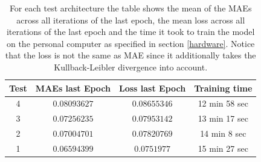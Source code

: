 \begin{center}
    \begin{table}[H]
        \centering
        \begin{tabular}{ | c | c | c | c | }
            \hline
            Test &MAEs last Epoch & Loss last Epoch & Training time\\ \hline
            4 & $0.08093627$  & $0.08655346$  & 12 min 58 sec  \\
            3 & $0.07256235$  & $0.07953142$  & 13 min 17 sec  \\
            2 & $0.07004701$  & $0.07820769$  & 14 min 8 sec  \\  
            1 & $0.06594399$  & $0.0751977$  & 15 min 27 sec  \\  
            \hline
        \end{tabular} 
        \caption{For each test architecture the table shows the mean of the MAEs across all iterations of the last
        epoch, the mean loss across all iterations of the last epoch and the time it took to train the model
        on the personal computer as specified in section \ref{hardware}. Notice that the loss is not the same
        as MAE since it additionally takes the Kullback-Leibler divergence into account.}
    \end{table} \label{table_mae_1}
\end{center}



